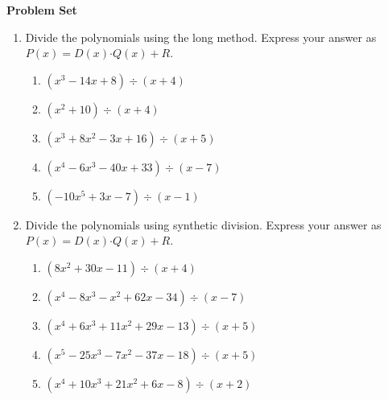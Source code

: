 \textbf{Problem Set}

\vspce
\begin{enumerate}[label = \Alph*. ]

\item 
Divide the polynomials using the long method. Express your answer as  $P(x)  =D(x) \boldsymbol{\cdot} Q(x) +R$. 


\begin{enumerate}[label = \arabic*. ]

\item \hspce \hspce $(x^3-14x+8) \div (x+4)$
\vspce
\item \hspce \hspce $(x^2+10) \div (x+4)$
\vspce
\item \hspce \hspce $(x^3+8x^2-3x+16) \div (x+5)$
\vspce
\item \hspce \hspce $(x^4-6x^3-40x+33) \div (x-7)$
\vspce
\item \hspce \hspce $(-10x^5+3x-7) \div (x-1)$


\end{enumerate}

\item Divide the polynomials using synthetic division. Express your answer as  $P(x)  =D(x) \boldsymbol{\cdot} Q(x) +R$. 

\begin{enumerate}[label = \arabic*. ]
\item \hspce \hspce $(8x^2+30x-11) \div (x+4)$
\vspce
\item \hspce \hspce $(x^4-8x^3-x^2+62x-34) \div (x-7)$
\vspce
\item \hspce \hspce $(x^4+6x^3+11x^2+29x-13) \div (x+5)$
\vspce
\item \hspce \hspce $(x^5-25x^3-7x^2-37x-18) \div (x+5)$
\vspce
\item \hspce \hspce $(x^4+10x^3+21x^2+6x-8) \div (x+2)$


\end{enumerate} 
 



\end{enumerate}